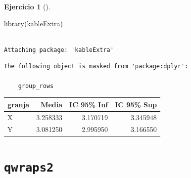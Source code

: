 \documentclass[
  a4paper,
]{scrreport}
\newenvironment{Shaded}{\begin{snugshade}}{\end{snugshade}}
\newcommand{\AttributeTok}[1]{\textcolor[rgb]{0.40,0.45,0.13}{#1}}
\newcommand{\CommentTok}[1]{\textcolor[rgb]{0.37,0.37,0.37}{#1}}
\newcommand{\DecValTok}[1]{\textcolor[rgb]{0.68,0.00,0.00}{#1}}
\newcommand{\FunctionTok}[1]{\textcolor[rgb]{0.28,0.35,0.67}{#1}}
\newcommand{\NormalTok}[1]{\textcolor[rgb]{0.00,0.23,0.31}{#1}}
\newcommand{\OtherTok}[1]{\textcolor[rgb]{0.00,0.23,0.31}{#1}}
\newcommand{\SpecialCharTok}[1]{\textcolor[rgb]{0.37,0.37,0.37}{#1}}
\newcommand{\StringTok}[1]{\textcolor[rgb]{0.13,0.47,0.30}{#1}}
\theoremstyle{definition}
\newtheorem{exercise}{Ejercicio}[chapter]
\theoremstyle{remark}
\begin{document}
\begin{exercise}[]
\begin{enumerate}
\begin{tcolorbox}
\begin{Shaded}
\begin{Highlighting}[]
\FunctionTok{library}\NormalTok{(kableExtra)}
\end{Highlighting}
\end{Shaded}

\begin{verbatim}

Attaching package: 'kableExtra'
\end{verbatim}

\begin{verbatim}
The following object is masked from 'package:dplyr':

    group_rows
\end{verbatim}

\begin{Shaded}
\end{Shaded}

  \begin{table}
  \centering
  \begin{tabular}{l|r|r|r}
  \hline
  granja & Media & IC 95\% Inf & IC 95\% Sup\\
  \hline
  X & 3.258333 & 3.170719 & 3.345948\\
  \hline
  Y & 3.081250 & 2.995950 & 3.166550\\
  \hline
  \end{tabular}
  \end{table}

  \section{\texorpdfstring{\texttt{qwraps2}}{qwraps2}}


\end{tcolorbox}
\end{enumerate}
\end{exercise}
\end{document}
